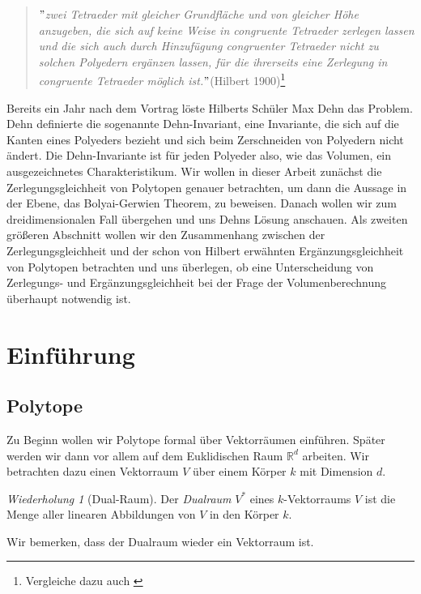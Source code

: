 \documentclass[11pt,titlepage]{article}
\newcommand{\setR}{\mathbb{R}}
\theoremstyle{definition}
\theoremstyle{remark}
\newtheorem*{repetition}{Wiederholung}
\begin{document}
	\begin{quote}
		\textsl{$"$zwei Tetraeder mit gleicher Grundfläche
			und von gleicher Höhe anzugeben, die sich auf keine Weise in
			congruente Tetraeder zerlegen lassen und die sich auch durch 
			Hinzufügung congruenter Tetraeder nicht zu solchen Polyedern ergänzen
			lassen, für die ihrerseits eine Zerlegung in congruente Tetraeder
			möglich ist.$"$}(Hilbert 1900)\footnote{Vergleiche dazu auch \cite{Hilbert1900}}
	\end{quote}
	Bereits ein Jahr nach dem Vortrag löste Hilberts Schüler Max Dehn 
	das Problem. Dehn definierte die sogenannte Dehn-Invariant, eine 
	Invariante, die sich auf die Kanten eines Polyeders bezieht und sich 
	beim Zerschneiden von Polyedern nicht ändert. 
	Die Dehn-Invariante ist für jeden Polyeder 
	also, wie das Volumen, ein ausgezeichnetes Charakteristikum. 
	Wir wollen in dieser Arbeit zunächst die Zerlegungsgleichheit 
	von Polytopen genauer betrachten, um dann die Aussage in der Ebene, 
	das Bolyai-Gerwien Theorem, zu beweisen. Danach wollen wir zum 
	dreidimensionalen Fall übergehen und uns Dehns Lösung anschauen. 
	Als zweiten größeren Abschnitt wollen wir den Zusammenhang zwischen 
	der Zerlegungsgleichheit und der schon 
	von Hilbert erwähnten Ergänzungsgleichheit von Polytopen 
	betrachten und uns überlegen, ob eine Unterscheidung von Zerlegungs- 
	und Ergänzungsgleichheit bei der Frage der Volumenberechnung überhaupt 
	notwendig ist. 
	
	\newpage
	
	\section{Einführung}
	
	\subsection{Polytope}
	
	Zu Beginn wollen wir Polytope formal über Vektorräumen einführen. Später werden 
	wir dann vor allem auf dem Euklidischen Raum $\setR^d$ arbeiten. 
	Wir betrachten dazu einen Vektorraum $V$ über einem Körper $k$ mit Dimension $d$. 
	
	\begin{repetition}[Dual-Raum]
		Der \textsl{Dualraum} $V^*$ eines $k$-Vektorraums $V$ ist die Menge aller linearen Abbildungen von $V$ in den Körper $k$.
	\end{repetition}
	Wir bemerken, dass der Dualraum wieder ein Vektorraum ist.
	
\end{document}

